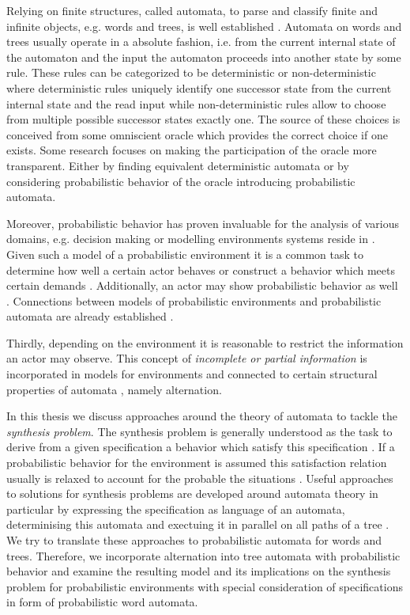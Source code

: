 Relying on finite structures, called automata, to parse and classify finite and
infinite objects, e.g. words and trees, is well established \cite{LangAutoLog,%
AutoInfObj}. Automata on words and trees usually operate in a absolute fashion,
i.e. from the current internal state of the automaton and the input the
automaton proceeds into another state by some rule. These rules can be
categorized to be deterministic or non-deterministic where deterministic rules
uniquely identify one successor state from the current internal state and the
read input while non-deterministic rules allow to choose from multiple possible
successor states exactly one. The source of these choices is conceived from
some omniscient oracle which provides the correct choice if one exists. Some
research focuses on making the participation of the oracle more transparent.
Either by finding equivalent deterministic automata
\cite{NonDetBuechiToDetParity} or by considering probabilistic behavior of the
oracle \cite{RandAutoInfTrees,RecOmeLangProbAuto} introducing probabilistic
automata.

Moreover, probabilistic behavior has proven invaluable for the analysis of
various domains, e.g. decision making \cite{ActingOptimallyInPOSD} or modelling
environments systems reside in \cite{PrinciplesOfMC}. Given such a model of a
probabilistic environment it is a common task to determine how well a certain
actor behaves \cite{PrinciplesOfMC} or construct a behavior which meets certain
demands \cite{SynProbEnv,QuanStochParityGames}. Additionally, an actor may show
probabilistic behavior as well \cite{RandomnessForFree}. Connections between
models of probabilistic environments and probabilistic automata are already
established \cite{DecProblemsForProbAuto}.

Thirdly, depending on the environment it is reasonable to restrict the
information an actor may observe. This concept of \emph{incomplete or partial
information} is incorporated in models for environments \cite{QualAnaPOMDP} and
connected to certain structural properties of automata 
\cite{ChurchsProblemRevisited}, namely alternation.

In this thesis we discuss approaches around the theory of automata to tackle
the \emph{synthesis problem}. The synthesis problem is generally understood as
the task to derive from a given specification a behavior which satisfy this
specification \cite{Church}. If a probabilistic behavior for the environment is
assumed this satisfaction relation usually is relaxed to account for the
probable the situations \cite{SynProbEnv,PrinciplesOfMC,QualAnaPOMDP}. Useful
approaches to solutions for synthesis problems are developed around automata
theory in particular by expressing the specification as language of an
automata, determinising this automata and exectuing it in parallel on all paths
of a tree \cite{ChurchsProblemRevisited,SynProbEnv,AutoInfObj,%
ParityGamesPosDet}. We try to translate these approaches to probabilistic
automata for words and trees. Therefore, we incorporate alternation into tree
automata with probabilistic behavior and examine the resulting model and its
implications on the synthesis problem for probabilistic environments with
special consideration of specifications in form of probabilistic word automata.
